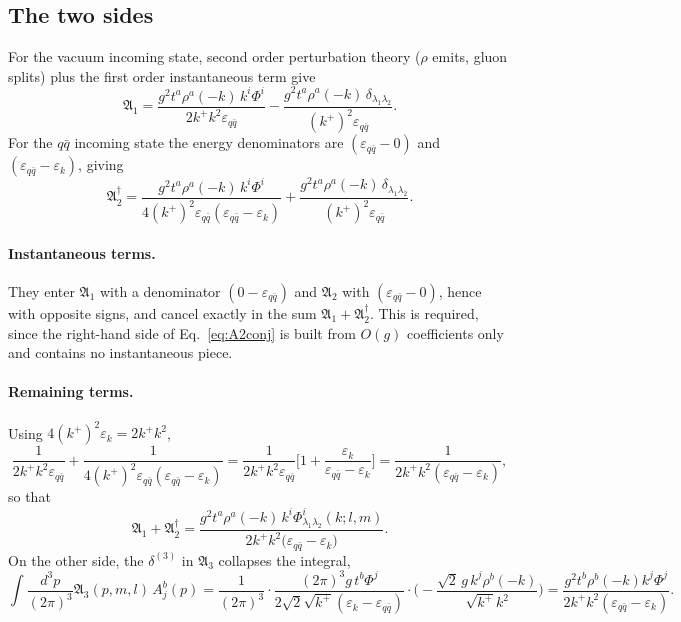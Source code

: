 \documentclass[11pt]{article}
\newcommand{\mf}{\mathfrak}
\newcommand{\eps}{\varepsilon}
\newcommand{\dg}{\dagger}
\newcommand{\ip}[1]{\int\!\frac{d^{3}#1}{(2\pi)^{3}}}
\newcommand{\dthree}{\delta^{(3)}}
\begin{document}
\subsection{The two sides}

For the vacuum incoming state, second order perturbation theory ($\rho$ emits, gluon splits) plus
the first order instantaneous term give
\begin{equation}
\mf A_{1}=\frac{g^{2}t^{a}\rho^{a}(-k)\,k^{i}\Phi^{i}}{2k^{+}k^{2}\eps_{q\bar q}}
-\frac{g^{2}t^{a}\rho^{a}(-k)\,\delta_{\lambda_1\lambda_2}}{(k^{+})^{2}\eps_{q\bar q}} .
\end{equation}
For the $q\bar q$ incoming state the energy denominators are $(\eps_{q\bar q}-0)$ and
$(\eps_{q\bar q}-\eps_{k})$, giving
\begin{equation}
\mf A_{2}^{\dg}=\frac{g^{2}t^{a}\rho^{a}(-k)\,k^{i}\Phi^{i}}
{4(k^{+})^{2}\eps_{q\bar q}(\eps_{q\bar q}-\eps_{k})}
+\frac{g^{2}t^{a}\rho^{a}(-k)\,\delta_{\lambda_1\lambda_2}}{(k^{+})^{2}\eps_{q\bar q}} .
\end{equation}

\paragraph{Instantaneous terms.} They enter $\mf A_{1}$ with a denominator $(0-\eps_{q\bar q})$
and $\mf A_{2}$ with $(\eps_{q\bar q}-0)$, hence with opposite signs, and cancel exactly in the
sum $\mf A_{1}+\mf A_{2}^{\dg}$. This is required, since the right-hand side of
Eq.~\eqref{eq:A2conj} is built from $O(g)$ coefficients only and contains no instantaneous piece.

\paragraph{Remaining terms.} Using $4(k^{+})^{2}\eps_{k}=2k^{+}k^{2}$,
\begin{equation}
\frac{1}{2k^{+}k^{2}\eps_{q\bar q}}+\frac{1}{4(k^{+})^{2}\eps_{q\bar q}(\eps_{q\bar q}-\eps_{k})}
=\frac{1}{2k^{+}k^{2}\eps_{q\bar q}}\Big[1+\frac{\eps_{k}}{\eps_{q\bar q}-\eps_{k}}\Big]
=\frac{1}{2k^{+}k^{2}(\eps_{q\bar q}-\eps_{k})},
\end{equation}
so that
\begin{equation}
\mf A_{1}+\mf A_{2}^{\dg}
=\frac{g^{2}t^{a}\rho^{a}(-k)\,k^{i}\Phi^{i}_{\lambda_1\lambda_2}(k;l,m)}
{2k^{+}k^{2}\big(\eps_{q\bar q}-\eps_{k}\big)} .
\end{equation}
On the other side, the $\dthree$ in $\mf A_{3}$ collapses the integral,
\begin{equation}
\ip{p}\mf A_{3}(p,m,l)\,A^{b}_{j}(p)
=\frac{1}{(2\pi)^{3}}\cdot\frac{(2\pi)^{3}g\,t^{b}\Phi^{j}}{2\sqrt2\sqrt{k^{+}}(\eps_{k}-\eps_{q\bar q})}
\cdot\Big(-\frac{\sqrt2\,g\,k^{j}\rho^{b}(-k)}{\sqrt{k^{+}}k^{2}}\Big)
=\frac{g^{2}t^{b}\rho^{b}(-k)k^{j}\Phi^{j}}{2k^{+}k^{2}(\eps_{q\bar q}-\eps_{k})} .
\end{equation}
\end{document}
